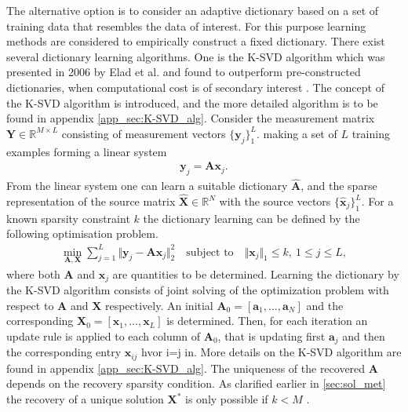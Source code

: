 The alternative option is to consider an adaptive dictionary based on a set of training data that resembles the data of interest. 
For this purpose learning methods are considered to empirically construct a fixed dictionary. 
There exist several dictionary learning algorithms. One is the K-SVD algorithm which was presented in 2006 by Elad et al. and found to outperform pre-constructed dictionaries, when computational cost is of secondary interest \cite{Elad2006}. 
The concept of the K-SVD algorithm is introduced, and the more detailed algorithm is to be found in appendix \ref{app_sec:K-SVD_alg}. 
Consider the measurement matrix $\mathbf{Y} \in \mathbb{R}^{M \times L}$ consisting of measurement vectors $\lbrace \mathbf{y}_j \rbrace_1^L$. making a set of $L$ training examples forming a linear system
\begin{align*}
\mathbf{y}_j = \mathbf{A} \mathbf{x}_j.
\end{align*}
From the linear system one can learn a suitable dictionary $\hat{\mathbf{A}}$, and the sparse representation of the source matrix $\hat{\mathbf{X}} \in \mathbb{R}^N$ with the source vectors $\lbrace \hat{\mathbf{x}}_j \rbrace_1^L$.
For a known sparsity constraint $k$ the dictionary learning can be defined by the following optimisation problem. 
\begin{align}\label{eq:SVD1}
\min_{\mathbf{A}, \mathbf{X}} \sum_{j=1}^{L} \Vert \mathbf{y}_j - \mathbf{A} \mathbf{x}_j \Vert_2^2 \quad \text{subject to} \quad \Vert \textbf{x}_j \Vert_1 \leq k, \ 1 \leq j \leq L,
\end{align}
where both $\textbf{A}$ and $\textbf{x}_j$ are quantities to be determined.
Learning the dictionary by the K-SVD algorithm consists of joint solving of the optimization problem with respect to $\mathbf{A}$ and $\mathbf{X}$ respectively. 
An initial $\textbf{A}_0 = [\textbf{a}_1,\hdots,\textbf{a}_N]$ and the corresponding $\textbf{X}_0 = [\textbf{x}_1,\hdots,\textbf{x}_L]$ is determined. Then, for each iteration an update rule is applied to each column of $\textbf{A}_0$, that is updating first $\textbf{a}_j$ and then the corresponding entry $\textbf{x}_{ij}$ hvor i=j in. 
More details on the K-SVD algorithm are found in appendix \ref{app_sec:K-SVD_alg}. 
The uniqueness of the recovered $\mathbf{A}$ depends on the recovery sparsity condition. As clarified earlier in \ref{sec:sol_met} the recovery of a unique solution $\mathbf{X}^\ast$ is only possible if $k < M$ \cite{phd2015}.


